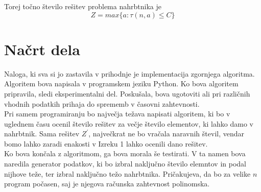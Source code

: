 \documentclass[a4paper,15pt]{article}
\begin{document}
\noindent Torej točno število rešitev problema nahrbtnika je $$Z= max\{a: \tau (n,a) \leq C\} $$

\section{Načrt dela}

\noindent Naloga, ki sva si jo zastavila v prihodnje je implementacija zgornjega algoritma. Algoritem bova napisala v programskem jeziku Python.
Ko bova algoritem pripravila, sledi eksperimentalni del. Poskušala, bova ugotoviti ali pri različnih vhodnih podatkih prihaja do sprememb v časovni zahtevnosti. 
  \vspace{3mm} \\
Pri samem programiranju bo največja težava napisati algoritem, ki bo v uglednem času ocenil število rešitev za večje število elementov, ki lahko damo v nahrbtnik. Sama rešitev $Z^{'}$, največkrat ne bo vračala naravnih števil, vendar bomo lahko zaradi enakosti v Izreku 1 lahko ocenili dano rešitev.
\vspace{3mm}\\
Ko bova končala z algoritmom, ga bova morala še testirati. V ta namen bova naredila generator podatkov, ki bo izbral naključno število elemntov in podal nijhove teže, ter izbral naključno težo nahrbtnika. Pričakujeva, da bo za velike $n$ program počasen, saj je njegova računska zahtevnost polinomska.
\end{document}
